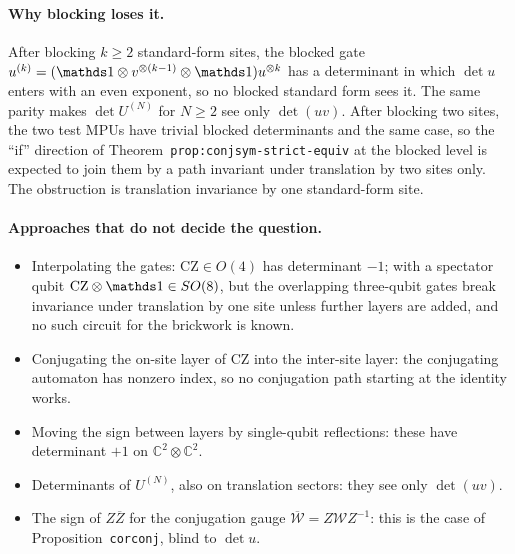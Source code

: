 \documentclass{article}
\begin{document}
\paragraph{Why blocking loses it.} After blocking $k\ge2$ standard-form sites,
the blocked gate $u^{(k)}=(\Id\otimes v^{\otimes(k-1)}\otimes\Id)u^{\otimes k}$
has a determinant in which $\det u$ enters with an even exponent, so no blocked
standard form sees it. The same parity makes $\det U^{(N)}$ for $N\ge2$ see
only $\det(uv)$. After blocking two sites, the two test MPUs have trivial
blocked determinants and the same case, so the ``if'' direction of
Theorem~\texttt{prop:conjsym-strict-equiv} at the blocked level is expected to
join them by a path invariant under translation by two sites only. The
obstruction is translation invariance by one standard-form site.

\paragraph{Approaches that do not decide the question.}
\begin{itemize}
    \item Interpolating the gates: $\mathrm{CZ}\in O(4)$ has determinant $-1$;
          with a spectator qubit $\mathrm{CZ}\otimes\Id\in SO(8)$, but the
          overlapping three-qubit gates break invariance under translation by
          one site unless further layers are added, and no such circuit for
          the brickwork is known.
    \item Conjugating the on-site layer of $\mathrm{CZ}$ into the inter-site
          layer: the conjugating automaton has nonzero index, so no conjugation
          path starting at the identity works.
    \item Moving the sign between layers by single-qubit reflections: these have
          determinant $+1$ on $\mathbb C^2\otimes\mathbb C^2$.
    \item Determinants of $U^{(N)}$, also on translation sectors: they see only
          $\det(uv)$.
    \item The sign of $Z\overline Z$ for the conjugation gauge
          $\overline{\mathcal W}=Z\mathcal WZ^{-1}$: this is the case of
          Proposition~\texttt{corconj}, blind to $\det u$.
\end{itemize}
\end{document}
